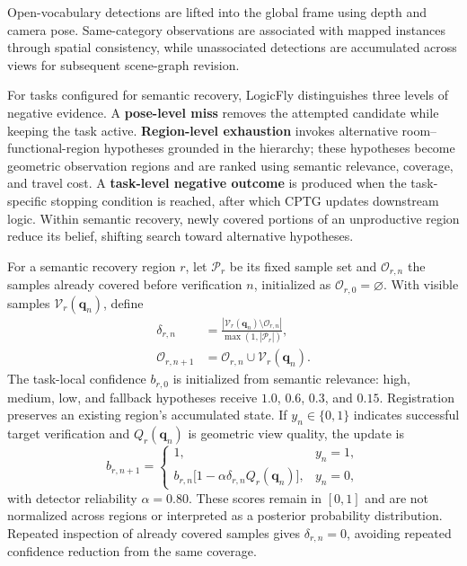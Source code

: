 \documentclass[letterpaper,10pt,journal]{IEEEtran}
\begin{document}
Open-vocabulary detections are lifted into the global frame using depth and camera pose. Same-category observations are associated with mapped instances through spatial consistency, while unassociated detections are accumulated across views for subsequent scene-graph revision.

For tasks configured for semantic recovery, LogicFly distinguishes three levels of negative evidence. A \textbf{pose-level miss} removes the attempted candidate while keeping the task active. \textbf{Region-level exhaustion} invokes alternative room--functional-region hypotheses grounded in the hierarchy; these hypotheses become geometric observation regions and are ranked using semantic relevance, coverage, and travel cost. A \textbf{task-level negative outcome} is produced when the task-specific stopping condition is reached, after which CPTG updates downstream logic. Within semantic recovery, newly covered portions of an unproductive region reduce its belief, shifting search toward alternative hypotheses.

For a semantic recovery region $r$, let $\mathcal P_r$ be its fixed sample set and $\mathcal O_{r,n}$ the samples already covered before verification $n$, initialized as $\mathcal O_{r,0}=\varnothing$. With visible samples $\mathcal V_r(\mathbf q_n)$, define
\begin{equation}
\begin{aligned}
\delta_{r,n}&=\frac{|\mathcal V_r(\mathbf q_n)\setminus\mathcal O_{r,n}|}
{\max(1,|\mathcal P_r|)},\\
\mathcal O_{r,n+1}&=\mathcal O_{r,n}\cup\mathcal V_r(\mathbf q_n).
\end{aligned}
\label{eq:recovery-coverage}
\end{equation}
The task-local confidence $b_{r,0}$ is initialized from semantic relevance: high, medium, low, and fallback hypotheses receive $1.0$, $0.6$, $0.3$, and $0.15$. Registration preserves an existing region's accumulated state. If $y_n\in\{0,1\}$ indicates successful target verification and $Q_r(\mathbf q_n)$ is geometric view quality, the update is
\begin{equation}
b_{r,n+1}=
\begin{cases}
1,&y_n=1,\\
b_{r,n}\bigl[1-\alpha\delta_{r,n}Q_r(\mathbf q_n)\bigr],&y_n=0,
\end{cases}
\label{eq:recovery-belief}
\end{equation}
with detector reliability $\alpha=0.80$. These scores remain in $[0,1]$ and are not normalized across regions or interpreted as a posterior probability distribution. Repeated inspection of already covered samples gives $\delta_{r,n}=0$, avoiding repeated confidence reduction from the same coverage.
\end{document}
